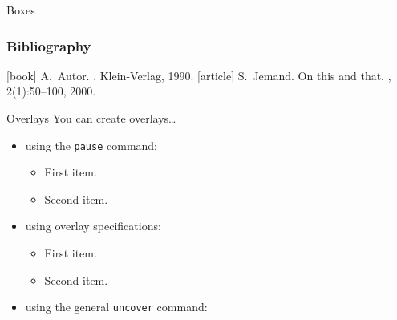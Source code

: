 \documentclass[xcolor={dvipsnames},10pt]{beamer}
\begin{document}
\begin{frame}{Boxes}
\end{frame}

\begin{frame}[allowframebreaks]
    \frametitle<presentation>{Bibliography}
    \begin{thebibliography}{10}
        [book]
        A.~Autor.
        .
        \newblock Klein-Verlag, 1990.
        [article]
        S.~Jemand.
        \newblock On this and that.
        , 2(1):50--100, 2000.
    \end{thebibliography}
\end{frame}

\begin{frame}{Overlays}
    You can create overlays\dots
    \begin{itemize}
        \item using the \texttt{pause} command:
            \begin{itemize}
                \item
                    First item.
                    \pause
                \item
                    Second item.
            \end{itemize}
        \item
            using overlay specifications:
            \begin{itemize}
                \item<3->
                    First item.
                \item<4->
                    Second item.
            \end{itemize}
        \item
            using the general \texttt{uncover} command:
            \begin{itemize}
        \end{itemize}
    \end{itemize}
\end{frame}
\end{document}
